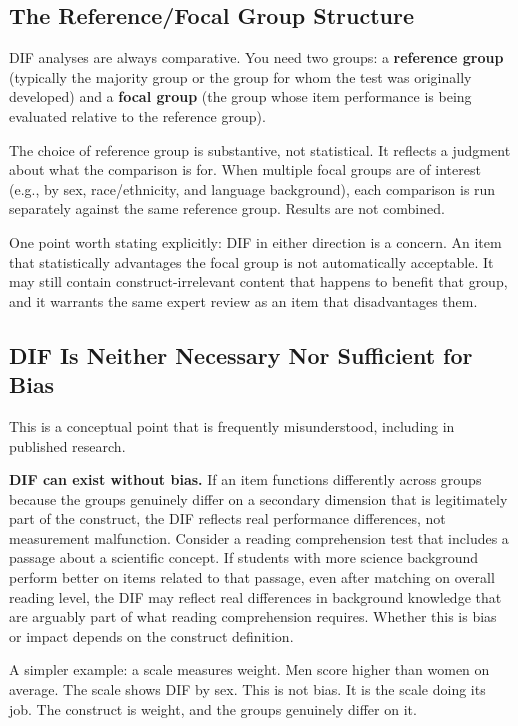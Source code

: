 \documentclass[
  11pt,
  letterpaper,
]{scrbook}
\begin{document}
\subsection{The Reference/Focal Group
Structure}\label{the-referencefocal-group-structure}

DIF analyses are always comparative. You need two groups: a
\textbf{reference group} (typically the majority group or the group for
whom the test was originally developed) and a \textbf{focal group} (the
group whose item performance is being evaluated relative to the
reference group).

The choice of reference group is substantive, not statistical. It
reflects a judgment about what the comparison is for. When multiple
focal groups are of interest (e.g., by sex, race/ethnicity, and language
background), each comparison is run separately against the same
reference group. Results are not combined.

One point worth stating explicitly: DIF in either direction is a
concern. An item that statistically advantages the focal group is not
automatically acceptable. It may still contain construct-irrelevant
content that happens to benefit that group, and it warrants the same
expert review as an item that disadvantages them.

\subsection{DIF Is Neither Necessary Nor Sufficient for
Bias}\label{dif-is-neither-necessary-nor-sufficient-for-bias}

This is a conceptual point that is frequently misunderstood, including
in published research.

\textbf{DIF can exist without bias.} If an item functions differently
across groups because the groups genuinely differ on a secondary
dimension that is legitimately part of the construct, the DIF reflects
real performance differences, not measurement malfunction. Consider a
reading comprehension test that includes a passage about a scientific
concept. If students with more science background perform better on
items related to that passage, even after matching on overall reading
level, the DIF may reflect real differences in background knowledge that
are arguably part of what reading comprehension requires. Whether this
is bias or impact depends on the construct definition.

A simpler example: a scale measures weight. Men score higher than women
on average. The scale shows DIF by sex. This is not bias. It is the
scale doing its job. The construct is weight, and the groups genuinely
differ on it.
\end{document}
